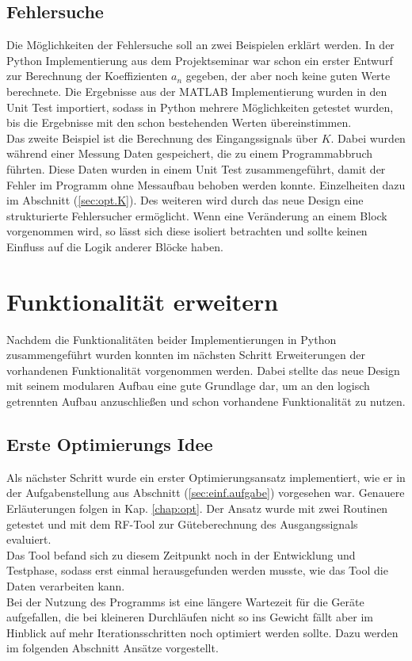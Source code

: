 \documentclass[../Report.tex]{subfiles}
\begin{document}
\subsection{Fehlersuche}
\label{sec:vorg.fehlersuche}
Die Möglichkeiten der Fehlersuche soll an zwei Beispielen erklärt werden. In der Python Implementierung aus dem Projektseminar \cite{PJS_Denys} war schon ein erster Entwurf zur Berechnung der Koeffizienten $a_n$ gegeben, der aber noch keine guten Werte berechnete. Die Ergebnisse aus der MATLAB Implementierung wurden in den Unit Test importiert, sodass in Python mehrere Möglichkeiten getestet wurden, bis die Ergebnisse mit den schon bestehenden Werten übereinstimmen. \\
Das zweite Beispiel ist die Berechnung des Eingangssignals über $K$. Dabei wurden während einer Messung Daten gespeichert, die zu einem Programmabbruch führten. Diese Daten wurden in einem Unit Test zusammengeführt, damit der Fehler im Programm ohne Messaufbau behoben werden konnte. Einzelheiten dazu im Abschnitt (\ref{sec:opt.K}).
Des weiteren wird durch das neue Design eine strukturierte Fehlersucher ermöglicht. Wenn eine Veränderung an einem Block vorgenommen wird, so lässt sich diese isoliert betrachten und sollte keinen Einfluss auf die Logik anderer Blöcke haben.

\section[Funktionalität erweitern]{Funktionalität erweitern}
\label{sec:vorg.erweiterung}
Nachdem die Funktionalitäten beider Implementierungen in Python zusammengeführt wurden konnten im nächsten Schritt Erweiterungen der vorhandenen Funktionalität vorgenommen werden. Dabei stellte das neue Design mit seinem modularen Aufbau eine gute Grundlage dar, um an den logisch getrennten Aufbau anzuschließen und schon vorhandene Funktionalität zu nutzen.
\subsection{Erste Optimierungs Idee}
\label{sec:vorg.optimierung}
Als nächster Schritt wurde ein erster Optimierungsansatz implementiert, wie er in der Aufgabenstellung aus Abschnitt (\ref{sec:einf.aufgabe}) vorgesehen war. Genauere Erläuterungen folgen in Kap. \ref{chap:opt}. Der Ansatz wurde mit zwei Routinen getestet und mit dem RF-Tool zur Güteberechnung des Ausgangssignals evaluiert. \\
Das Tool befand sich zu diesem Zeitpunkt noch in der Entwicklung und Testphase, sodass erst einmal herausgefunden werden musste, wie das Tool die Daten verarbeiten kann.\\
Bei der Nutzung des Programms ist eine längere Wartezeit für die Geräte aufgefallen, die bei kleineren Durchläufen nicht so ins Gewicht fällt aber im Hinblick auf mehr Iterationsschritten noch optimiert werden sollte. Dazu werden im folgenden Abschnitt Ansätze vorgestellt.
\end{document}
